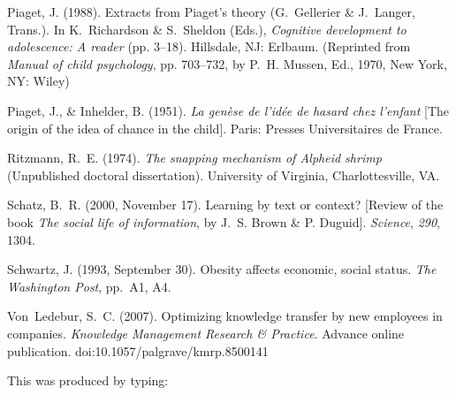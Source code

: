 \documentclass[]{interact}
\theoremstyle{plain}%
\theoremstyle{definition}
\theoremstyle{remark}
\begin{document}
\begin{thebibliography}{}
Piaget, J. (1988). Extracts from Piaget's theory (G.~Gellerier \& J.~Langer,
 Trans.). In K.~Richardson \& S.~Sheldon (Eds.), \emph{Cognitive development
 to adolescence: A reader} (pp. 3--18). Hillsdale, NJ: Erlbaum. (Reprinted
 from \emph{Manual of child psychology}, pp. 703--732, by P.~H. Mussen, Ed.,
 1970, New York, NY: Wiley)

Piaget, J., \& Inhelder, B. (1951). \emph{La gen{\`e}se de l'id{\'e}e de
 hasard chez l'enfant} [The origin of the idea of chance in the child]. Paris:
 Presses Universitaires de France.

Ritzmann, R.~E. (1974). \emph{The snapping mechanism of \emph{Alpheid} shrimp}
 (Unpublished doctoral dissertation). University of Virginia, Charlottesville,
 VA.

Schatz, B.~R. (2000, November 17). Learning by text or context? [Review of the
 book \emph{The social life of information}, by J.~S. Brown \& P. Duguid].
\emph{Science}, \emph{290}, 1304.

Schwartz, J. (1993, September 30). Obesity affects economic, social status.
 \emph{The Washington Post}, pp.~A1, A4.

Von~Ledebur, S.~C. (2007). Optimizing knowledge transfer by new employees in
 companies. \emph{Knowledge Management Research \& Practice}. Advance online
 publication. doi:10.1057/palgrave/kmrp.8500141

\end{thebibliography}
\bigskip
\noindent This was produced by typing:
\end{document}
